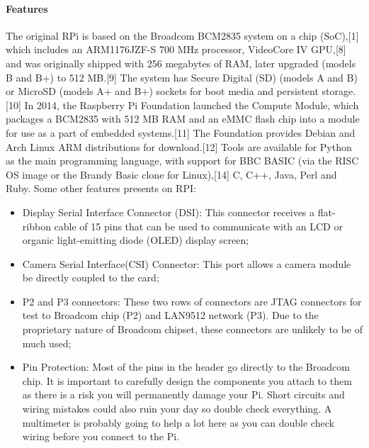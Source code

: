 \documentclass{acm_proc_article-sp}
\begin{document}
\paragraph{Features}
The original RPi is based on the Broadcom BCM2835 system on a chip (SoC),[1] which includes an ARM1176JZF-S 700 MHz processor, VideoCore IV GPU,[8] and was originally shipped with 256 megabytes of RAM, later upgraded (models B and B+) to 512 MB.[9] The system has Secure Digital (SD) (models A and B) or MicroSD (models A+ and B+) sockets for boot media and persistent storage.[10]
\newline
\newline
In 2014, the Raspberry Pi Foundation launched the Compute Module, which packages a BCM2835 with 512 MB RAM and an eMMC flash chip into a module for use as a part of embedded systems.[11]
The Foundation provides Debian and Arch Linux ARM distributions for download.[12] Tools are available for Python as the main programming language, with support for BBC BASIC (via the RISC OS image or the Brandy Basic clone for Linux),[14] C, C++, Java, Perl and Ruby.
\newline
\newline
Some other features presents on RPI:
\begin{itemize}
\item Display Serial Interface Connector (DSI): This connector receives a flat-ribbon cable of 15 pins that can be used to communicate with an LCD or organic light-emitting diode (OLED) display screen;	
\item Camera Serial Interface(CSI) Connector: This port allows a camera module be directly coupled to the card;
\item P2 and P3 connectors: These two rows of connectors are JTAG connectors for test to Broadcom chip (P2) and LAN9512 network (P3). Due to the proprietary nature of Broadcom chipset, these connectors are unlikely to be of much used;
\item Pin Protection: Most of the pins in the header go directly to the Broadcom chip. It is important to carefully design the components you attach to them as there is a risk you will permanently damage your Pi. Short circuits and wiring mistakes could also ruin your day so double check everything. A multimeter is probably going to help a lot here as you can double check wiring before you connect to the Pi.
\end{itemize}
\end{document}
